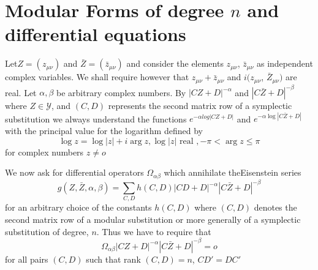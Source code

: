 \chapter{Modular Forms of degree \texorpdfstring{$n$}{n} and differential equations}%

Let\pageoriginale $Z=(z_{\mu \nu})$ and $\bar{Z}=(\bar{z}_{\mu \nu})$
and consider  
the elements $z_{\mu \nu}$, $\bar{z}_{\mu \nu}$ as independent complex
variables. We shall require however that $z_{\mu \nu}+\bar{z}_{\mu
  \nu}$ and $i (z_{\mu \nu}$, $\bar{Z}_{\mu \nu})$ are real. Let $\alpha
, \beta $ be arbitrary complex numbers. By
$|CZ+D|^{-\alpha}$ and  $|C\bar{Z}+D|^{- \beta}$ where $Z \in
\mathscr{Y}$, and $(C,D)$ represents the second matrix row of a
symplectic substitution we always understand the functions $e^{-\alpha
  log |CZ+D|}$ and $e^{-\alpha \log |C \bar{Z}+D|}$ with the principal
value for the logarithm defined by  
$$
\log z = \log |z| + i \arg  z, \log |z| \text { real },-\pi < \arg z
\leq \pi 
$$
for complex numbers $z \neq o$

We now ask for differential operators $\Omega_{\alpha \beta}$ which
annihilate the\break Eisenstein series 
\begin{equation*}
g(Z,\bar{Z},\alpha,\beta)=\sum_{C,D} h(C,D)|CD+D|^{-\alpha} |C
\bar{Z}+D|^{-\beta} \tag{270}\label{eq270}  
 \end{equation*}
 for an arbitrary choice of the constants $h (C,D)$ where $(C,D)$
 denotes the second matrix row of a modular substitution or more
 generally of a symplectic substitution of degree, $n$. Thus we have
 to require that  
\begin{equation*}
\Omega_{\alpha \beta} |CZ+D|^{- \alpha}|C \bar{Z}+D|^{- \beta}=o
\tag{271}\label{eq271}   
\end{equation*}
for all pairs $(C,D)$ such that rank $(C,D)=n$, $CD'=DC'$ 

